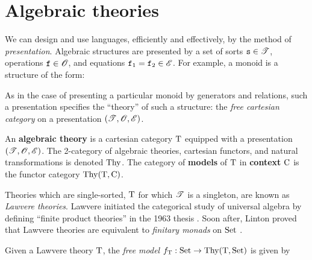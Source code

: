 \documentclass[stthol.tex]{subfiles}
\begin{document}
\section{Algebraic theories}
\label{algthy}

We can design and use languages, efficiently and effectively, by the method of \textit{presentation}. Algebraic structures are presented by a set of sorts $\mathtt{s}\in \mathscr{T}$, operations $\mathtt{f}\in \mathscr{O}$, and equations $\mathtt{f}_1=\mathtt{f}_2\in \mathscr{E}$. For example, a monoid is a structure of the form:

As in the case of presenting a particular monoid by generators and relations, such a presentation specifies the ``theory'' of such a structure: the \textit{free cartesian category} on a presentation $(\mathscr{T},\mathscr{O},\mathscr{E})$.

\begin{definition}
  An \textbf{algebraic theory} is a cartesian category $\mathrm{T}$ equipped with a presentation $(\mathscr{T},\mathscr{O},\mathscr{E})$.
  The 2-category of algebraic theories, cartesian functors, and natural transformations is denoted $\mathrm{Thy}$.
  The category of \textbf{models} of $\mathrm{T}$ in \textbf{context} $\mathrm{C}$ is the functor category $\mathrm{Thy}(\mathrm{T},\mathrm{C})$.
\end{definition}

Theories which are single-sorted, $\mathrm{T}$ for which $\mathscr{T}$ is a singleton, are known as \textit{Lawvere theories}. Lawvere initiated the categorical study of universal algebra by defining ``finite product theories'' in the 1963 thesis \cite{lawvere}. Soon after, Linton proved that Lawvere theories are equivalent to \textit{finitary monads} on $\mathrm{Set}$ \cite{linton}.

Given a Lawvere theory $\mathrm{T}$, the \textit{free model} $f_{\mathrm{T}}:\mathrm{Set}\to \mathrm{Thy}(\mathrm{T},\mathrm{Set})$ is given by
\end{document}

